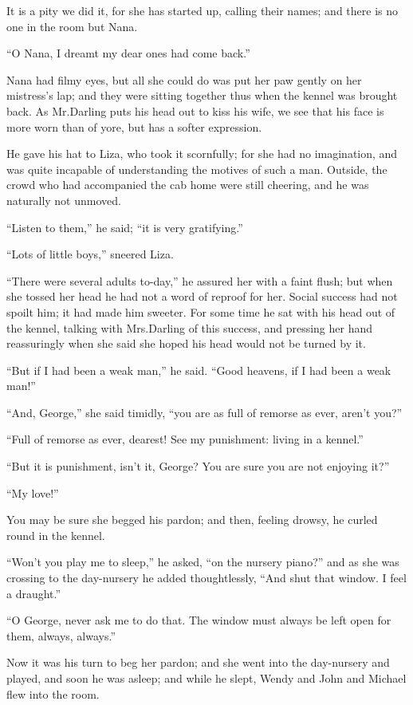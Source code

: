 It is a pity we did it, for she has started up, calling their names;
and there is no one in the room but Nana.

“O Nana, I dreamt my dear ones had come back.”

Nana had filmy eyes, but all she could do was put her paw gently on her mistress’s lap;
and they were sitting together thus when the kennel was brought back.
As Mr.\@ Darling puts his head out to kiss his wife,
we see that his face is more worn than of yore, but has a softer expression.

He gave his hat to Liza, who took it scornfully;
for she had no imagination, and was quite incapable of understanding the motives of such a man.
Outside, the crowd who had accompanied the cab home were still cheering,
and he was naturally not unmoved.

“Listen to them,” he said;
“it is very gratifying.”

“Lots of little boys,” sneered Liza.

“There were several adults to-day,” he assured her with a faint flush;
but when she tossed her head he had not a word of reproof for her.
Social success had not spoilt him;
it had made him sweeter.
For some time he sat with his head out of the kennel,
talking with Mrs.\@ Darling of this success,
and pressing her hand reassuringly when she said she hoped his head would not be turned by it.

“But if I had been a weak man,” he said.
“Good heavens, if I had been a weak man!”

“And, George,” she said timidly,
“you are as full of remorse as ever, aren’t you?”

“Full of remorse as ever, dearest!
See my punishment:
living in a kennel.”

“But it is punishment, isn’t it, George?
You are sure you are not enjoying it?”

“My love!”

You may be sure she begged his pardon;
and then, feeling drowsy, he curled round in the kennel.

“Won’t you play me to sleep,” he asked, “on the nursery piano?\@”
and as she was crossing to the day-nursery he added thoughtlessly,
“And shut that window.
I feel a draught.”

“O George, never ask me to do that.
The window must always be left open for them, always, always.”

Now it was his turn to beg her pardon;
and she went into the day-nursery and played, and soon he was asleep;
and while he slept, Wendy and John and Michael flew into the room.

